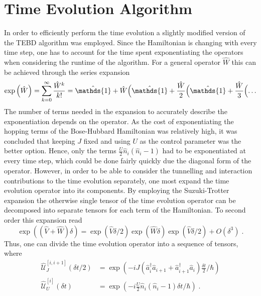 \chapter{Time Evolution Algorithm}

In order to efficiently perform the time evolution a slightly modified version of the TEBD algorithm was employed. Since the Hamiltonian is changing with every time step, one has to account for the time spent exponentiating the operators when considering the runtime of the algorithm. For a general operator $\hat{W}$ this can be achieved through the series expansion
\begin{equation}
	\exp \left( \hat{W} \right) = \sum_{k = 0}^{\infty} \frac{\hat{W}^k}{k!} = \hat{\mathds{1}} + \hat{W} \Bigl(  \hat{\mathds{1}} + \frac{\hat{W}}{2} \Bigl( \hat{\mathds{1}} + \frac{\hat{W}}{3} \Bigl( \ldots
\end{equation}
The number of terms needed in the expansion to accurately describe the exponentiation depends on the operator. As the cost of exponentiating the hopping terms of the Bose-Hubbard Hamiltonian was relatively high, it was concluded that keeping $J$ fixed and using $U$ as the control parameter was the better option. Hence, only the terms $\frac{U}{2} \hat{n}_i (\hat{n}_i -1)$ had to be exponentiated at every time step, which could be done fairly quickly due the diagonal form of the operator. However, in order to be able to consider the tunnelling and interaction contributions to the time evolution separately, one most expand the time evolution operator into its components. By employing the Suzuki-Trotter expansion the otherwise single tensor of the time evolution operator can be decomposed into separate tensors for each term of the Hamiltonian. To second order this expansion read
\begin{equation}
	\exp\left(  ( \hat{V} + \hat{W}  ) \delta \right) = \exp\left(  \hat{V} \delta /2  \right) \exp\left(  \hat{W} \delta   \right) \exp\left(  \hat{V} \delta /2  \right) + O(\delta^3) \; . \label{eq:SuzukiTrotter}
\end{equation}
Thus, one can divide the time evolution operator into a sequence of tensors, where
\begin{align}
	\hat{\mathcal{U}}_{J}^{[i,i+1]} (\delta t/2) &= \exp \left( -i J ( \hat{a}_{i}^{\dag} \hat{a}_{i+1} + \hat{a}_{i+1}^{\dag} \hat{a}_{i} ) \frac{\delta t}{2} / \hbar \right) \\
	\hat{\mathcal{U}}_{U}^{[i]} (\delta t) &= \exp \left( -i \frac{U}{2} \hat{n}_i (\hat{n}_i -1) \delta t / \hbar \right) \; .
\end{align}
